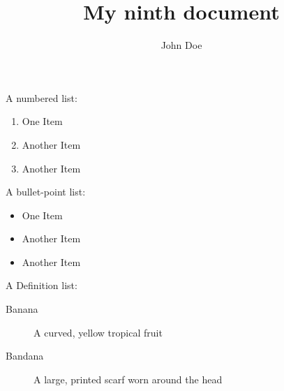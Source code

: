 \documentclass{article}
\title{My ninth document}
\author{John Doe}
\begin{document}
  \maketitle
   
  A numbered list:

\begin{enumerate}
\item One Item
\item Another Item
\item Another Item
\end{enumerate}

\vspace{2em}
  
  A bullet-point list:

\begin{itemize}
\item One Item
\item Another Item
\item Another Item
\end{itemize}

\vspace{2em}
  
  A Definition list:
  
\begin{description}
\item[Banana] A curved, yellow tropical fruit
\item[Bandana] A large, printed scarf worn around the head
\end{description}
   
\end{document}
